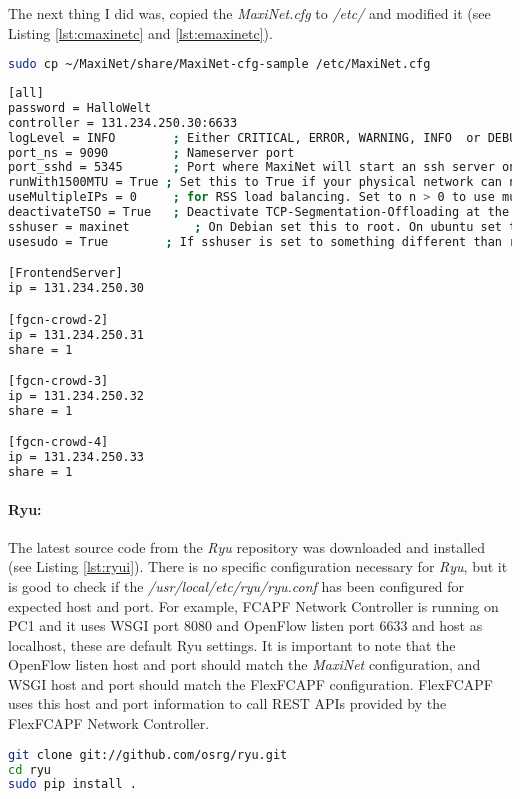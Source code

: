 The next thing I did was, copied the \textit{MaxiNet.cfg} to \textit{/etc/} and modified it (see Listing \ref{lst:cmaxinetc} and \ref{lst:emaxinetc}).
\begin{lstlisting}[caption={Copy MaxiNet configuration},label={lst:cmaxinetc},language=bash,tabsize=2,basicstyle=\footnotesize,breaklines=true,showspaces=false,showstringspaces=false,showtabs=false,frame=single]
sudo cp ~/MaxiNet/share/MaxiNet-cfg-sample /etc/MaxiNet.cfg
\end{lstlisting}

\begin{lstlisting}[caption={Edit MaxiNet configuration},label={lst:emaxinetc},language=bash,tabsize=2,basicstyle=\footnotesize,breaklines=true,showspaces=false,showstringspaces=false,showtabs=false,frame=single]
[all]
password = HalloWelt
controller = 131.234.250.30:6633
logLevel = INFO        ; Either CRITICAL, ERROR, WARNING, INFO  or DEBUG
port_ns = 9090         ; Nameserver port
port_sshd = 5345       ; Port where MaxiNet will start an ssh server on each worker
runWith1500MTU = True ; Set this to True if your physical network can not handle MTUs >1500.
useMultipleIPs = 0     ; for RSS load balancing. Set to n > 0 to use multiple IP addresses per worker. More information on this feature can be found at MaxiNets github Wiki.
deactivateTSO = True   ; Deactivate TCP-Segmentation-Offloading at the emulated hosts.
sshuser = maxinet         ; On Debian set this to root. On ubuntu set this to user which can do passwordless sudo
usesudo = True        ; If sshuser is set to something different than root set this to True.

[FrontendServer]
ip = 131.234.250.30

[fgcn-crowd-2]
ip = 131.234.250.31
share = 1

[fgcn-crowd-3]
ip = 131.234.250.32
share = 1

[fgcn-crowd-4]
ip = 131.234.250.33
share = 1
\end{lstlisting}

\paragraph{Ryu:} 
The latest source code from the \textit{Ryu} repository was downloaded and installed (see Listing \ref{lst:ryui}). There is no specific configuration necessary for \textit{Ryu}, but it is good to check if the \textit{/usr/local/etc/ryu/ryu.conf} has been configured for expected host and port. For example, FCAPF Network Controller is running on PC1 and it uses WSGI port 8080 and OpenFlow listen port 6633 and host as localhost, these are default Ryu settings. It is important to note that the OpenFlow listen host and port should match the \textit{MaxiNet} configuration, and WSGI host and port should match the FlexFCAPF configuration. FlexFCAPF uses this host and port information to call REST APIs provided by the FlexFCAPF Network Controller.
\begin{lstlisting}[caption={Ryu installation},label={lst:ryui},language=bash,tabsize=2,basicstyle=\footnotesize,breaklines=true,showspaces=false,showstringspaces=false,showtabs=false,frame=single]
git clone git://github.com/osrg/ryu.git
cd ryu
sudo pip install .
\end{lstlisting}


